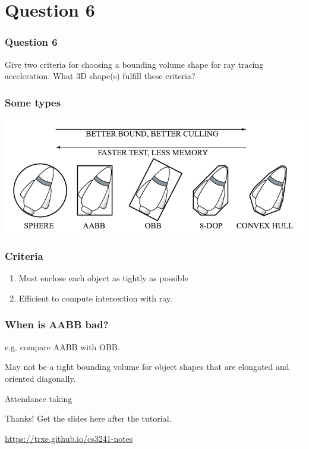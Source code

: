 \documentclass{beamer}
\begin{document}
\section{Question 6}

\begin{frame}
    \frametitle{Question 6}
    Give two criteria for choosing a bounding volume shape for ray tracing acceleration. 
    What 3D shape(s) fulfill these criteria?
\end{frame}

\begin{frame}
    \frametitle{Some types}

    \begin{center}
        \includegraphics[scale=0.3]{best-to-worst-bb.png}
    \end{center}

\end{frame}

\begin{frame}
    \frametitle{Criteria}

    \begin{enumerate}
        \item Must enclose each object as tightly as possible
        \item Efficient to compute intersection with ray.
    \end{enumerate}

\end{frame}

\begin{frame}
    \frametitle{When is AABB bad?}

    e.g. compare AABB with OBB.

    \begin{tcolorbox}
        May not be a tight bounding volume for object shapes that are elongated and oriented diagonally.
    \end{tcolorbox}

\end{frame}


\begin{frame}
    \AlegreyaExtraBold \LARGE
    Attendance taking
\end{frame}

\ThankYou
\begin{frame}
    Thanks! Get the slides here after the tutorial.\\
    \vspace{2em}
    \scalebox{3}{\faGithub}\par\bigskip
    \url{https://trxe.github.io/cs3241-notes}
\end{frame}
\end{document}
